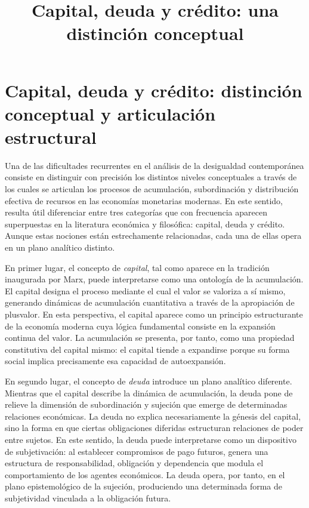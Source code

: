 \documentclass[12pt]{article}
\title{Capital, deuda y crédito: una distinción conceptual}
\author{}
\date{}
\begin{document}
\maketitle

\onehalfspacing

\section*{Capital, deuda y crédito: distinción conceptual y articulación estructural}

Una de las dificultades recurrentes en el análisis de la desigualdad contemporánea consiste en distinguir con precisión los distintos niveles conceptuales a través de los cuales se articulan los procesos de acumulación, subordinación y distribución efectiva de recursos en las economías monetarias modernas. En este sentido, resulta útil diferenciar entre tres categorías que con frecuencia aparecen superpuestas en la literatura económica y filosófica: capital, deuda y crédito. Aunque estas nociones están estrechamente relacionadas, cada una de ellas opera en un plano analítico distinto.

En primer lugar, el concepto de \textit{capital}, tal como aparece en la tradición inaugurada por Marx, puede interpretarse como una ontología de la acumulación. El capital designa el proceso mediante el cual el valor se valoriza a sí mismo, generando dinámicas de acumulación cuantitativa a través de la apropiación de plusvalor. En esta perspectiva, el capital aparece como un principio estructurante de la economía moderna cuya lógica fundamental consiste en la expansión continua del valor. La acumulación se presenta, por tanto, como una propiedad constitutiva del capital mismo: el capital tiende a expandirse porque su forma social implica precisamente esa capacidad de autoexpansión.

En segundo lugar, el concepto de \textit{deuda} introduce un plano analítico diferente. Mientras que el capital describe la dinámica de acumulación, la deuda pone de relieve la dimensión de subordinación y sujeción que emerge de determinadas relaciones económicas. La deuda no explica necesariamente la génesis del capital, sino la forma en que ciertas obligaciones diferidas estructuran relaciones de poder entre sujetos. En este sentido, la deuda puede interpretarse como un dispositivo de subjetivación: al establecer compromisos de pago futuros, genera una estructura de responsabilidad, obligación y dependencia que modula el comportamiento de los agentes económicos. La deuda opera, por tanto, en el plano epistemológico de la sujeción, produciendo una determinada forma de subjetividad vinculada a la obligación futura.
\end{document}
